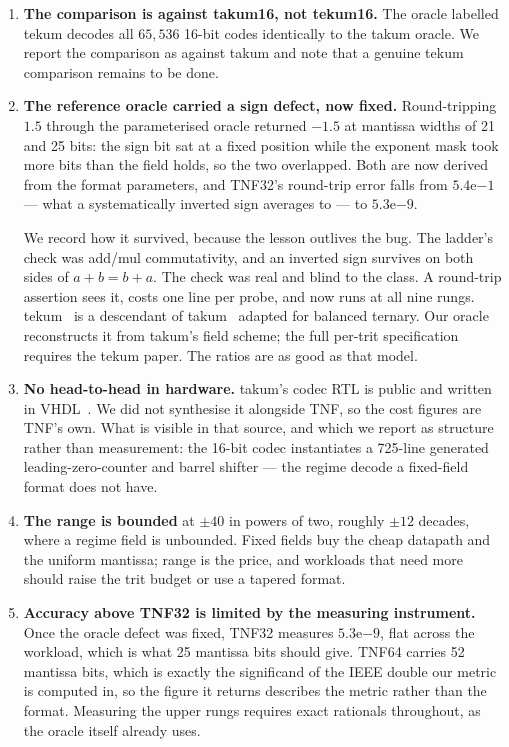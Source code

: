 \documentclass[11pt]{article}
\theoremstyle{definition}
\begin{document}
\begin{enumerate}[leftmargin=*]
\item \textbf{The comparison is against takum16, not tekum16.} The oracle
labelled tekum decodes all $65{,}536$ 16-bit codes identically to the takum
oracle. We report the comparison as against takum and note that a genuine tekum
comparison remains to be done.

\item \textbf{The reference oracle carried a sign defect, now fixed.} Round-tripping
$1.5$ through the parameterised oracle returned $-1.5$ at mantissa widths of 21
and 25 bits: the sign bit sat at a fixed position while the exponent mask took
more bits than the field holds, so the two overlapped. Both are now derived from
the format parameters, and TNF32's round-trip error falls from
$5.4\mathrm{e}{-1}$ --- what a systematically inverted sign averages to --- to
$5.3\mathrm{e}{-9}$.

We record how it survived, because the lesson outlives the bug. The ladder's
check was add/mul commutativity, and an inverted sign survives on both sides of
$a+b=b+a$. The check was real and blind to the class. A round-trip assertion sees
it, costs one line per probe, and now runs at all nine rungs. tekum~\cite{tekum} is a descendant of takum~\cite{takum} adapted for balanced
ternary. Our
oracle reconstructs it from takum's field scheme; the full per-trit
specification requires the tekum paper. The ratios are as good as that model.

\item \textbf{No head-to-head in hardware.} takum's codec RTL is public and
written in VHDL~\cite{takumrtl}. We did not synthesise it alongside TNF, so the cost figures are
TNF's own. What is visible in that source, and which we report as structure
rather than measurement: the 16-bit codec instantiates a 725-line generated
leading-zero-counter and barrel shifter --- the regime decode a fixed-field
format does not have.

\item \textbf{The range is bounded} at $\pm40$ in powers of two, roughly $\pm12$
decades, where a regime field is unbounded. Fixed fields buy the cheap datapath
and the uniform mantissa; range is the price, and workloads that need more should
raise the trit budget or use a tapered format.

\item \textbf{Accuracy above TNF32 is limited by the measuring instrument.}
Once the oracle defect was fixed, TNF32 measures $5.3\mathrm{e}{-9}$, flat
across the workload, which is what 25 mantissa bits should give. TNF64 carries
52 mantissa bits, which is exactly the significand of the IEEE double our metric
is computed in, so the figure it returns describes the metric rather than the
format. Measuring the upper rungs requires exact rationals throughout, as the
oracle itself already uses.


\end{enumerate}
\end{document}
